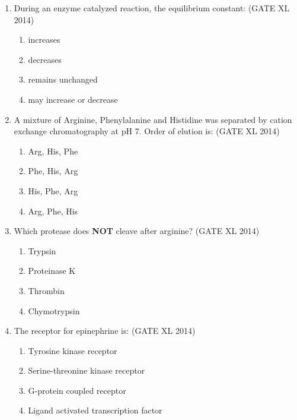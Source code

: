 \documentclass[journal,12pt,onecolumn]{IEEEtran}
\theoremstyle{remark}
\begin{document}
\begin{enumerate}
  \item During an enzyme catalyzed reaction, the equilibrium constant: 
  \hfill (GATE XL 2014)\\
  \begin{multicols}{2}
  \begin{enumerate}
    \item increases
    \item decreases
    \item remains unchanged
    \item may increase or decrease
  \end{enumerate}
  \end{multicols}

  \item A mixture of Arginine, Phenylalanine and Histidine was separated by cation exchange chromatography at pH 7. Order of elution is:
  \hfill (GATE XL 2014)\\
  \begin{multicols}{2}
  \begin{enumerate}
    \item Arg, His, Phe
    \item Phe, His, Arg
    \item His, Phe, Arg
    \item Arg, Phe, His
  \end{enumerate}
  \end{multicols}

  \item Which protease does \textbf{NOT} cleave after arginine? 
  \hfill (GATE XL 2014)\\
  \begin{multicols}{2}
  \begin{enumerate}
    \item Trypsin
    \item Proteinase K
    \item Thrombin
    \item Chymotrypsin
  \end{enumerate}
  \end{multicols}

  \item The receptor for epinephrine is:
  \hfill (GATE XL 2014)\\
  \begin{multicols}{2}
  \begin{enumerate}
    \item Tyrosine kinase receptor
    \item Serine-threonine kinase receptor
    \item G-protein coupled receptor
    \item Ligand activated transcription factor
  \end{enumerate}
  \end{multicols}


\end{enumerate}
\end{document}
